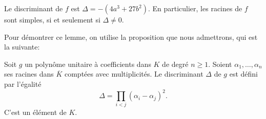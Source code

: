 \begin{lemme}
    \label{lem:lemme1}
    Le discriminant de $f$ est $\Delta = -(4a^3 + 27b^2)$. En particulier, les racines de $f$ sont simples, si et seulement si $\Delta \neq 0$.
\end{lemme}

Pour démontrer ce lemme, on utilise la proposition que nous admettrons, qui est la suivante:
\begin{proposition}
    \label{prop:discriminant}
    Soit $g$ un polynôme unitaire à coefficients dans $K$ de degré $n \ge 1$. Soient
    $\alpha_1,\ldots,\alpha_{n}$ ses racines dans $\overline{K}$ comptées avec
    multiplicités. Le discriminant $\Delta$ de $g$ est défini par l'égalité
    \[
    \Delta = \prod_{i<j}^{} \left( \alpha_{i} - \alpha_{j} \right) ^2 
    .\] 
    C'est un élément de $K$.
\end{proposition}

